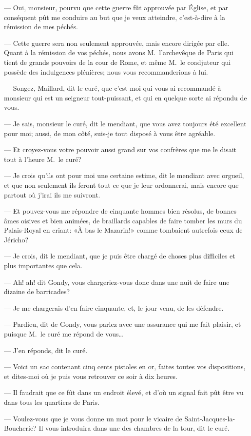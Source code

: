 — Oui, monsieur, pourvu que cette guerre fût approuvée par Église, et par conséquent pût me conduire au but que je veux atteindre, c'est-à-dire à la rémission de mes péchés.

— Cette guerre sera non seulement approuvée, mais encore dirigée par elle. Quant à la rémission de vos péchés, nous avons M.~l'archevêque de Paris qui tient de grands pouvoirs de la cour de Rome, et même M.~le coadjuteur qui possède des indulgences plénières; nous vous recommanderions à lui.

— Songez, Maillard, dit le curé, que c'est moi qui vous ai recommandé à monsieur qui est un seigneur tout-puissant, et qui en quelque sorte ai répondu de vous.

— Je sais, monsieur le curé, dit le mendiant, que vous avez toujours été excellent pour moi; aussi, de mon côté, suis-je tout disposé à vous être agréable.

— Et croyez-vous votre pouvoir aussi grand sur vos confrères que me le disait tout à l'heure M.~le curé?

— Je crois qu'ils ont pour moi une certaine estime, dit le mendiant avec orgueil, et que non seulement ils feront tout ce que je leur ordonnerai, mais encore que partout où j'irai ils me suivront.

— Et pouvez-vous me répondre de cinquante hommes bien résolus, de bonnes âmes oisives et bien animées, de braillards capables de faire tomber les murs du Palais-Royal en criant: «À bas le Mazarin!» comme tombaient autrefois ceux de Jéricho?

— Je crois, dit le mendiant, que je puis être chargé de choses plus difficiles et plus importantes que cela.

— Ah! ah! dit Gondy, vous chargeriez-vous donc dans une nuit de faire une dizaine de barricades?

— Je me chargerais d'en faire cinquante, et, le jour venu, de les défendre.

— Pardieu, dit de Gondy, vous parlez avec une assurance qui me fait plaisir, et puisque M.~le curé me répond de vous\dots

— J'en réponds, dit le curé.

— Voici un sac contenant cinq cents pistoles en or, faites toutes vos dispositions, et dites-moi où je puis vous retrouver ce soir à dix heures.

— Il faudrait que ce fût dans un endroit élevé, et d'où un signal fait pût être vu dans tous les quartiers de Paris.

— Voulez-vous que je vous donne un mot pour le vicaire de Saint-Jacques-la-Boucherie? Il vous introduira dans une des chambres de la tour, dit le curé.

